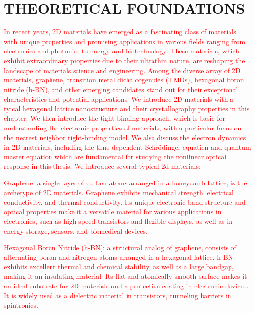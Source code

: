 %
\chapter{THEORETICAL FOUNDATIONS}
\label{ch:ch2}
\textcolor{red}{ In recent years, 2D materials have emerged as a fascinating class of materials with unique properties and promising applications in various fields ranging from electronics and photonics to energy and biotechnology. These materials, which exhibit extraordinary properties due to their ultrathin nature, are reshaping the landscape of materials science and engineering. Among the diverse array of 2D materials, graphene, transition metal dichalcogenides (TMDs), hexagonal boron nitride (\gls{h-BN}), and other emerging candidates stand out for their exceptional characteristics and potential applications. We introduce 2D materials with a tyical hexagonal lattice nanostructure and their crystallography properties in this chapter. We then introduce the tight-binding approach, which is basic for understanding the electronic properties of materials, with a particular focus on the nearest neighbor tight-binding model. We also discuss the electron dynamics in 2D materials, including the time-dependent Schrödinger equation and quantum master equation which are fundamental for studying the nonlinear optical response in this thesis. We introduce several typical 2d materials:}

\textcolor{red}{	Graphene: a single layer of carbon atoms arranged in a honeycomb lattice, is the archetype of 2D materials. Graphene exhibits mechanical strength, electrical conductivity, and thermal conductivity. Its unique electronic band structure and optical properties make it a versatile material for various applications in electronics, such as high-speed transistors and flexible displays, as well as in energy storage, sensors, and biomedical devices.}

\textcolor{red}{Hexagonal Boron Nitride (\gls{h-BN}):  a structural analog of graphene, consists of alternating boron and nitrogen atoms arranged in a hexagonal lattice. \gls{h-BN} exhibits excellent thermal and chemical stability, as well as a large bandgap, making it an insulating material. Its flat and atomically smooth surface makes it an ideal substrate for 2D materials and a protective coating in electronic devices. It is widely used as a dielectric material in transistors, tunneling barriers in spintronics.}

